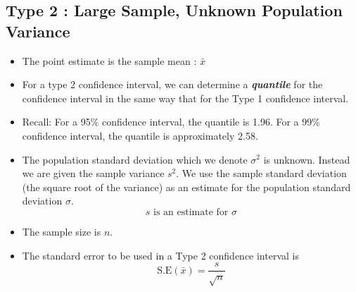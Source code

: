 \documentclass[a4paper,12pt]{article}
\begin{document}
\subsection*{Type 2 : Large Sample, Unknown Population Variance}
\begin{itemize}

\item The point estimate is the sample mean : $\bar{x}$

\item For a type 2 confidence interval, we can determine a \textbf{\textit{quantile}} for the confidence interval in the same way that for the Type 1 confidence interval.

\item Recall: For a 95\% confidence interval, the quantile is 1.96. For a 99\% confidence interval, the quantile is approximately 2.58.


\item The population standard deviation which we denote $\sigma^2$ is unknown.
Instead we are given the sample variance $s^2$. We use the sample standard deviation (the square root of the variance) as an estimate for the population standard deviation $\sigma$.
\[ s \mbox{ is an estimate for } \sigma \]

\item The sample size is $n$.
\item The standard error to be used in a Type 2 confidence interval is
\[ \mbox{S.E}(\bar{x}) = \frac{s}{\sqrt{n}}\]

\end{itemize}





\end{document}
